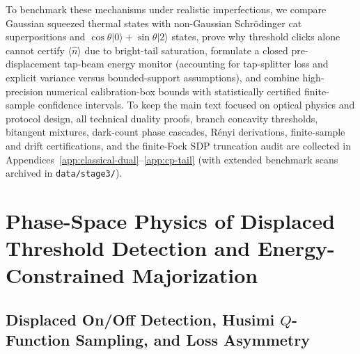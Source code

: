 \documentclass{iopjournal}
\newcommand{\ket}[1]{\lvert #1\rangle}
\begin{document}
To benchmark these mechanisms under realistic imperfections, we compare Gaussian squeezed thermal states with non-Gaussian Schr\"odinger cat superpositions and $\cos\theta\ket{0}+\sin\theta\ket{2}$ states, prove why threshold clicks alone cannot certify $\langle\hat n\rangle$ due to bright-tail saturation, formulate a closed pre-displacement tap-beam energy monitor (accounting for tap-splitter loss and explicit variance versus bounded-support assumptions), and combine high-precision numerical calibration-box bounds with statistically certified finite-sample confidence intervals. To keep the main text focused on optical physics and protocol design, all technical duality proofs, branch concavity thresholds, bitangent mixtures, dark-count phase cascades, R\'enyi derivations, finite-sample and drift certifications, and the finite-Fock SDP truncation audit are collected in Appendices~\ref{app:classical-dual}--\ref{app:cp-tail} (with extended benchmark scans archived in \texttt{data/stage3/}).

\section{Phase-Space Physics of Displaced Threshold Detection and Energy-Constrained Majorization}\label{sec:setup}

\subsection{Displaced On/Off Detection, Husimi \texorpdfstring{$Q$}{Q}-Function Sampling, and Loss Asymmetry}\label{subsec:povm}
\end{document}
